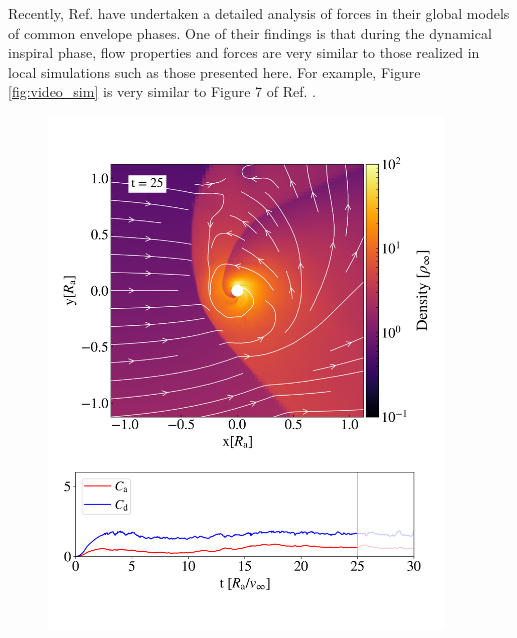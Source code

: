 Recently, Ref. \cite{Chamandy:2019psk} have undertaken a detailed analysis of forces in their global models of common envelope phases. One of their findings is that during the dynamical inspiral phase, flow properties and forces are very similar to those realized in local simulations such as those presented here. For example, Figure \ref{fig:video_sim} is very similar to Figure 7 of Ref. \cite{Chamandy:2019psk}. 




\begin{figure}[t]
\centering
  \includegraphics[width=10.5cm]{figures/common_envelope/movie_plot.pdf}

\end{figure}
